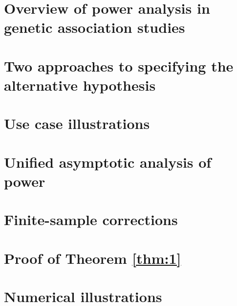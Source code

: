 \documentclass[11pt]{article}
\theoremstyle{definition}
\begin{document}
\tableofcontents

\section{Overview of power analysis in genetic association studies}
\label{sec:power-analysis-overview}


\section{Two approaches to specifying the alternative hypothesis}
\label{sec:disease-models}


\section{Use case illustrations}
\label{sec:user-guide}


\section{Unified asymptotic analysis of power}
\label{sec:asymptotic-equivalence}


\section{Finite-sample corrections}
\label{sec:finite-sample}


\section{Proof of Theorem \ref{thm:1}}
\label{sec:proof}


\section{Numerical illustrations}
\label{sec:numerical}


% 
\end{document}
